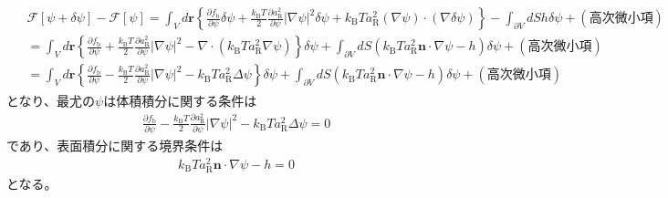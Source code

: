 \documentclass[a4paper,12pt, oneside, openany]{jsbook}
\begin{document}
\begin{eqnarray}
  \begin{split}
    &\mathcal{F}\left[\psi + \delta \psi\right] -\mathcal{F}\left[\psi \right] =\int_V d\boldsymbol{r} \left\{\frac{\partial f_{\text{b}}}{\partial \psi} \delta \psi + \frac{k_{\text{B}} T}{2}\frac{\partial a^2_{\text{R}}}{\partial \psi }\left\lvert \nabla \psi\right\rvert^2 \delta \psi +k_{\text{B}} T a^2_{\text{R}} (\nabla \psi)\cdot (\nabla \delta \psi)\right\}-\int _{\partial V}dS h \delta \psi +(高次微小項)\\
    &=\int_V d\boldsymbol{r}\left\{\frac{\partial f_{\text{b}}}{\partial \psi}  + \frac{k_{\text{B}} T}{2}\frac{\partial a^2_{\text{R}}}{\partial \psi }\left\lvert \nabla \psi\right\rvert^2  -\nabla \cdot \left(k_{\text{B}} T a^2_{\text{R}} \nabla \psi\right)  \right\}\delta \psi +\int _{\partial V} dS\left( k_{\text{B}} T a^2_{\text{R}} \boldsymbol{n} \cdot \nabla \psi -h\right)\delta \psi+(高次微小項)\\
    &=\int_V d\boldsymbol{r}\left\{\frac{\partial f_{\text{b}}}{\partial \psi}  - \frac{k_{\text{B}} T}{2}\frac{\partial a^2_{\text{R}}}{\partial \psi }\left\lvert \nabla \psi\right\rvert^2  -k_{\text{B}} T a^2_{\text{R}} \Delta \psi \right\}\delta \psi +\int _{\partial V} dS\left( k_{\text{B}} T a^2_{\text{R}} \boldsymbol{n} \cdot \nabla \psi -h\right)\delta \psi+(高次微小項)
  \end{split}
\end{eqnarray}
\normalsize
となり、最尤の$\psi$は体積積分に関する条件は
\begin{eqnarray}
  \label{main条件式1}
  \frac{\partial f_{\text{b}}}{\partial \psi}  - \frac{k_{\text{B}} T}{2}\frac{\partial a^2_{\text{R}}}{\partial \psi }\left\lvert \nabla \psi\right\rvert^2  -k_{\text{B}} T a^2_{\text{R}} \Delta \psi =0
\end{eqnarray}
であり、表面積分に関する境界条件は
\begin{eqnarray}
  \label{境界条件1}
  k_{\text{B}} T a^2_{\text{R}} \boldsymbol{n} \cdot \nabla \psi -h=0
\end{eqnarray}
となる。
\end{document}
